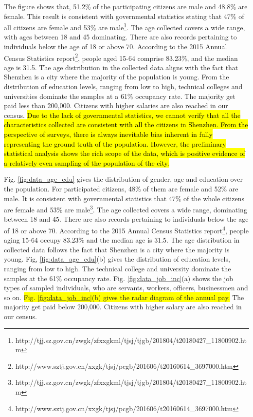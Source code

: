 \documentclass{ieeeaccess}
\begin{document}
The figure shows that, 51.2\% of the participating citizens are male and 48.8\% are female. This result is consistent with governmental statistics stating that 47\% of all citizens are female and 53\% are male\footnote{http://tjj.sz.gov.cn/zwgk/zfxxgkml/tjsj/tjgb/201804/t20180427\_11800902.htm}. The age collected covers a wide range, with ages between 18 and 45 dominating. There are also records pertaining to individuals below the age of 18 or above 70. According to the 2015 Annual Census Statistics report\footnote{http://www.sztj.gov.cn/xxgk/tjsj/pcgb/201606/t20160614\_3697000.htm}, people aged 15-64 comprise 83.23\%, and the median age is 31.5. The age distribution in the collected data aligns with the fact that Shenzhen is a city where the majority of the population is young. From the distribution of education levels, ranging from low to high, technical colleges and universities dominate the samples at a 61\% occupancy rate. The majority get paid less than 200,000. Citizens with higher salaries are also reached in our census. \hl{Due to the lack of governmental statistics, we cannot verify that all the characteristics collected are consistent with all the citizens in Shenzhen. From the perspective of surveys, there is always inevitable bias inherent in fully representing the ground truth of the population. However, the preliminary statistical analysis shows the rich scope of the data, which is positive evidence of a relatively even sampling of the population of the city.}


\iffalse
Fig. \ref{fig:data_age_edu} gives the distribution of gender, age and education over the population. For participated citizens, 48\% of them are female and 52\% are male. It is consistent with governmental statistics that 47\% of the whole citizens are female and 53\% are male\footnote{http://tjj.sz.gov.cn/zwgk/zfxxgkml/tjsj/tjgb/201804/t20180427\_11800902.htm}. The age collected covers a wide range, dominating between 18 and 45. There are also records pertaining to individuals below the age of 18 or above 70. According to the 2015 Annual Census Statistics report\footnote{http://www.sztj.gov.cn/xxgk/tjsj/pcgb/201606/t20160614\_3697000.htm}, people aging 15-64 occupy 83.23\% and the median age is 31.5. The age distribution in collected data follows the fact that Shenzhen is a city where the majority is young. Fig, \ref{fig:data_age_edu}(b) gives the distribution of education levels, ranging from low to high. The technical college and university dominate the samples at the 61\% occupancy rate. Fig. \ref{fig:data_job_inc}(a) shows the job types of sampled individuals, who are servants, workers, officers, businessmen and so on. \colorbox{yellow}{Fig. \ref{fig:data_job_inc}(b) gives the radar diagram of the annual pay.} The majority get paid below 200,000. Citizens with higher salary are also reached in our census.
\end{document}
